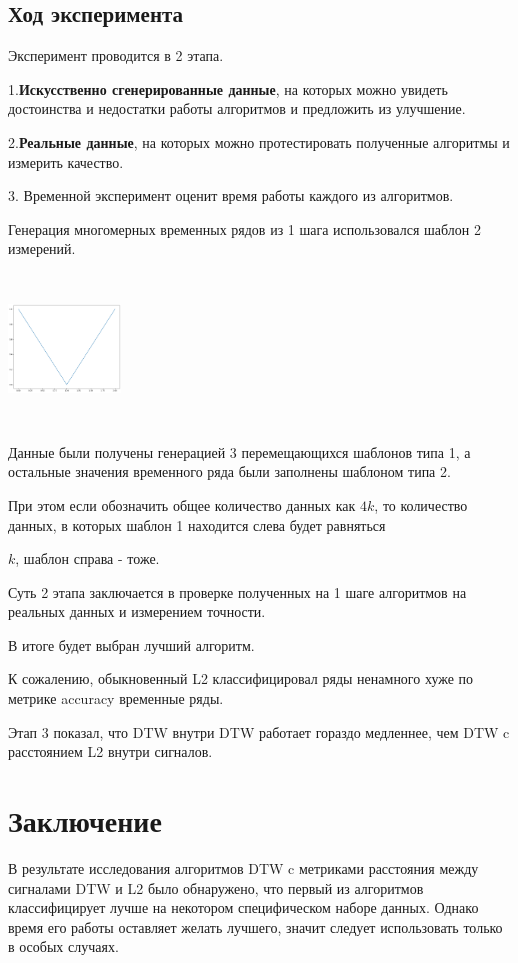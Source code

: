 \documentclass[12pt, twoside]{article}
\begin{document}
\subsection{Ход эксперимента}

Эксперимент проводится в 2 этапа.

1.\textbf{Искусственно сгенерированные данные}, на которых можно увидеть достоинства и недостатки работы алгоритмов и предложить из улучшение.

2.\textbf{Реальные данные}, на которых можно протестировать полученные алгоритмы и измерить качество.

3. Временной эксперимент оценит время работы каждого из алгоритмов.

Генерация многомерных временных рядов из 1 шага использовался шаблон 2 измерений.

\includegraphics[width=3cm, height=4cm]{sample1}


Данные были получены генерацией 3 перемещающихся шаблонов типа 1, а остальные значения временного ряда были заполнены шаблоном типа 2.

При этом если обозначить общее количество данных как $4k$, то количество данных, в которых шаблон 1 находится слева будет равняться

$k$, шаблон справа - тоже.



Суть 2 этапа заключается в проверке полученных на 1 шаге алгоритмов на реальных данных и измерением точности.

В итоге будет выбран лучший алгоритм.

К сожалению, обыкновенный L2 классифицировал ряды ненамного хуже по метрике accuracy временные ряды.


Этап 3 показал, что DTW внутри DTW работает гораздо медленнее, чем DTW c расстоянием L2 внутри сигналов.


\section{Заключение}

В результате исследования алгоритмов DTW c метриками расстояния между сигналами DTW и L2 было обнаружено, что первый из алгоритмов классифицирует лучше на некотором специфическом наборе данных. Однако время его работы оставляет желать лучшего, значит следует использовать
только в особых случаях.


\nocite{*}
 


\end{document}
